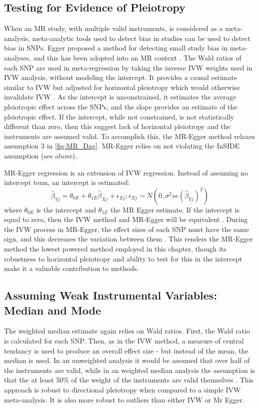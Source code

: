 \documentclass[journal,article,submit,moreauthors,pdftex]{Definitions/mdpi}
\begin{document}
\subsection{Testing for Evidence of Pleiotropy}
When an MR study, with multiple valid instruments, is considered as a meta-analysis, meta-analytic tools used to detect bias in studies can be used to detect bias in SNPs. Egger proposed a method for detecting small study bias in meta-analyses, and this has been adopted into an MR context \citep{bowden_framework_2017,bowdenMendelianRandomizationInvalid2015b}. The Wald ratios of each SNP are used in meta-regression by taking the inverse IVW weights used in IVW analysis, without modeling the intercept. It provides a causal estimate similar to IVW but adjusted for horizontal pleiotropy which would otherwise invalidate IVW \cite{bowdenMendelianRandomizationInvalid2015b}. As the intercept is unconstrained, it estimates the average pleiotropic effect across the SNPs, and the slope provides an estimate of the pleiotropic effect. If the intercept, while not constrained, is not statistically different than zero, then this suggest lack of horizontal pleiotropy and the instruments are assumed valid. To accomplish this, the MR-Egger method relaxes assumption 3 in \ref{fig:MR_Dag}. MR-Egger relies on not violating the InSIDE assumption (see above). 

MR-Egger regression is an extension of IVW regression. Instead of assuming no intercept term, an intercept is estimated:
\begin{equation}
\widehat{\beta}_{Yj} = \theta_{0E} + \theta_{1E}\widehat{\beta}_{Xj} + \epsilon_{Ej}; \epsilon_{Ej} \sim N(0,\sigma^2se(\widehat{\beta}_{Yj})^2)
\end{equation}
where $\theta_{0E}$ is the intercept and $\theta_{1E}$ the MR Egger estimate.
If the intercept is equal to zero, then the IVW method and MR-Egger will be equivalent \citep{burgess_interpreting_2017}. During the IVW process in MR-Egger, the effect sizes of each SNP must have the same sign, and this decreases the variation between them \citep{bowdenMendelianRandomizationInvalid2015b}. This renders the MR-Egger method the lowest powered method employed in this chapter, though its robustness to horizontal pleiotropy and ability to test for this in the intercept make it a valuable contribution to methods. 


\subsection{Assuming Weak Instrumental Variables: Median and Mode}
The weighted median estimate again relies on Wald ratios. First, the Wald ratio is calculated for each SNP. Then, as in the IVW method, a measure of central tendancy is used to produce an overall effect size - but instead of the mean, the median is used. In an unweighted analysis it would be assumed that over half of the instruments are valid, while in an weighted median analysis the assumption is that the at least 50\% of the weight of the instruments are valid themselves \citep{bowden_consistent_2016}. This approach is robust to directional pleiotropy when compared to a simple IVW meta-analysis. It is also more robust to outliers than either IVW or Mr Egger. 
\end{document}
